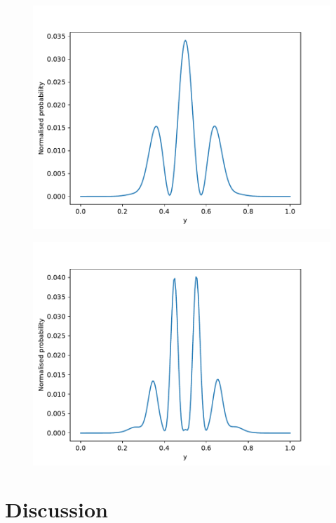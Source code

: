 \documentclass[english,notitlepage,reprint,nofootinbib]{revtex4-2}  %
\begin{document}
	\begin{figure}[h!]
		\centering
		\includegraphics[scale=0.55]{figures/problem9_double_slit.pdf}
		\caption{}
		\label{fig:prob9_double}
	\end{figure}
	
	\begin{figure}[H]
		\centering
		\includegraphics[scale=0.55]{figures/problem9_triple_slit.pdf}
		\caption{}
		\label{fig:prob9_triple}
	\end{figure}

	\section{Discussion}\label{sec:discussion}
	
\end{document}
